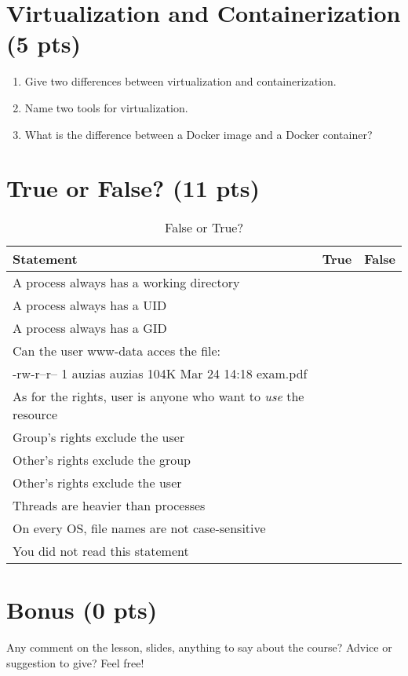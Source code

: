 \documentclass[11pt]{article}
\begin{document}
\section{Virtualization and Containerization (5 pts)}
	\begin{enumerate}
		\item Give two differences between virtualization and containerization. %
		\vspace{1cm}
		\item Name two tools for virtualization. %
		\vspace{1cm}
		\item What is the difference between a Docker image and a Docker container? %
		\vspace{1cm}
	\end{enumerate}

\pagebreak
\section{True or False? (11 pts)}
	\begin{table}[h]
	  \centering
	      \begin{tabular}{|l|r|l|}
			  \hline
	      		\textbf{Statement} &	\textbf{True}	& \textbf{False} \\ \hline
		      		A process always has a working directory &	& \\ \hline
		      		A process always has a UID &	& \\ \hline
		      		A process always has a GID &	& \\ \hline
					Can the user www-data acces the file: & & \\ %
					-rw-r--r-- 1 auzias auzias 104K Mar 24 14:18 exam.pdf &	& \\ \hline
		      		As for the rights, user is anyone who want to \emph{use} the resource &	& \\ \hline
		      		Group's rights exclude the user &	& \\ \hline
		      		Other's rights exclude the group &	& \\ \hline
		      		Other's rights exclude the user &	& \\ \hline
		      		Threads are heavier than processes &	& \\ \hline
		      		On every OS, file names are not case-sensitive &	& \\ \hline
		      		You did not read this statement &	& \\ \hline
	      \end{tabular}
	      \caption{False or True?}
	  \label{tab:routing}
	\end{table}

\section{Bonus (0 pts)}
Any comment on the lesson, slides, anything to say about the course? Advice or suggestion to give? Feel free!
\end{document}

